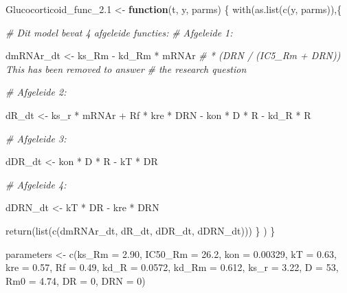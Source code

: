 \documentclass[
]{article}
\newenvironment{Shaded}{\begin{snugshade}}{\end{snugshade}}
\newcommand{\AttributeTok}[1]{\textcolor[rgb]{0.77,0.63,0.00}{#1}}
\newcommand{\CommentTok}[1]{\textcolor[rgb]{0.56,0.35,0.01}{\textit{#1}}}
\newcommand{\ControlFlowTok}[1]{\textcolor[rgb]{0.13,0.29,0.53}{\textbf{#1}}}
\newcommand{\DecValTok}[1]{\textcolor[rgb]{0.00,0.00,0.81}{#1}}
\newcommand{\FloatTok}[1]{\textcolor[rgb]{0.00,0.00,0.81}{#1}}
\newcommand{\FunctionTok}[1]{\textcolor[rgb]{0.00,0.00,0.00}{#1}}
\newcommand{\NormalTok}[1]{#1}
\newcommand{\OtherTok}[1]{\textcolor[rgb]{0.56,0.35,0.01}{#1}}
\newcommand{\SpecialCharTok}[1]{\textcolor[rgb]{0.00,0.00,0.00}{#1}}
\begin{document}
\begin{Shaded}
\begin{Highlighting}[]
\NormalTok{Glucocorticoid\_func\_2}\FloatTok{.1} \OtherTok{\textless{}{-}} \ControlFlowTok{function}\NormalTok{(t, y, parms) \{}
    \FunctionTok{with}\NormalTok{(}\FunctionTok{as.list}\NormalTok{(}\FunctionTok{c}\NormalTok{(y, parms)),\{}
      
      \CommentTok{\# Dit model bevat 4 afgeleide functies:}
      \CommentTok{\# Afgeleide 1:}
      
\NormalTok{      dmRNAr\_dt }\OtherTok{\textless{}{-}}\NormalTok{ ks\_Rm }\SpecialCharTok{{-}}\NormalTok{ kd\_Rm }\SpecialCharTok{*}\NormalTok{ mRNAr }\CommentTok{\# * (DRN / (IC5\_Rm + DRN)) This has been removed to answer}
                                         \CommentTok{\# the research question}
  
      \CommentTok{\# Afgeleide 2:}
  
\NormalTok{      dR\_dt }\OtherTok{\textless{}{-}}\NormalTok{ ks\_r }\SpecialCharTok{*}\NormalTok{ mRNAr }\SpecialCharTok{+}\NormalTok{ Rf }\SpecialCharTok{*}\NormalTok{ kre }\SpecialCharTok{*}\NormalTok{ DRN }\SpecialCharTok{{-}}\NormalTok{ kon }\SpecialCharTok{*}\NormalTok{ D }\SpecialCharTok{*}\NormalTok{ R }\SpecialCharTok{{-}}\NormalTok{ kd\_R }\SpecialCharTok{*}\NormalTok{ R}
      
      \CommentTok{\# Afgeleide 3:}
  
\NormalTok{      dDR\_dt }\OtherTok{\textless{}{-}}\NormalTok{ kon }\SpecialCharTok{*}\NormalTok{ D }\SpecialCharTok{*}\NormalTok{ R }\SpecialCharTok{{-}}\NormalTok{ kT }\SpecialCharTok{*}\NormalTok{ DR}
  
      \CommentTok{\# Afgeleide 4:}
  
\NormalTok{      dDRN\_dt }\OtherTok{\textless{}{-}}\NormalTok{ kT }\SpecialCharTok{*}\NormalTok{ DR }\SpecialCharTok{{-}}\NormalTok{ kre }\SpecialCharTok{*}\NormalTok{ DRN}
      
      \FunctionTok{return}\NormalTok{(}\FunctionTok{list}\NormalTok{(}\FunctionTok{c}\NormalTok{(dmRNAr\_dt, dR\_dt, dDR\_dt, dDRN\_dt)))}
\NormalTok{       \}}
\NormalTok{       )}
\NormalTok{\}}

\NormalTok{parameters }\OtherTok{\textless{}{-}} \FunctionTok{c}\NormalTok{(}\AttributeTok{ks\_Rm =} \FloatTok{2.90}\NormalTok{, }\AttributeTok{IC50\_Rm =} \FloatTok{26.2}\NormalTok{, }\AttributeTok{kon =} \FloatTok{0.00329}\NormalTok{,}
                \AttributeTok{kT =} \FloatTok{0.63}\NormalTok{, }\AttributeTok{kre =} \FloatTok{0.57}\NormalTok{, }\AttributeTok{Rf =} \FloatTok{0.49}\NormalTok{, }\AttributeTok{kd\_R =} \FloatTok{0.0572}\NormalTok{,}
                \AttributeTok{kd\_Rm =} \FloatTok{0.612}\NormalTok{, }\AttributeTok{ks\_r =} \FloatTok{3.22}\NormalTok{, }\AttributeTok{D =} \DecValTok{53}\NormalTok{, }\AttributeTok{Rm0 =} \FloatTok{4.74}\NormalTok{,}
                \AttributeTok{DR =} \DecValTok{0}\NormalTok{, }\AttributeTok{DRN =} \DecValTok{0}\NormalTok{)}


\end{Highlighting}
\end{Shaded}
\end{document}
